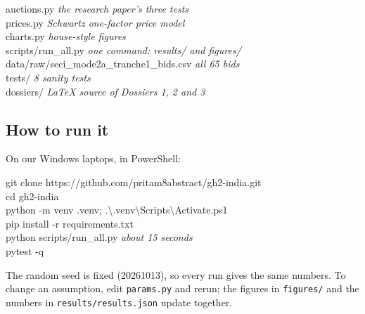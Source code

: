\begin{center}
\begin{minipage}{0.92\textwidth}
\hspace*{2em}auctions.py \hfill\textrm{\itshape\color{ink2} the research paper's three tests}\\
\hspace*{2em}prices.py \hfill\textrm{\itshape\color{ink2} Schwartz one-factor price model}\\
\hspace*{2em}charts.py \hfill\textrm{\itshape\color{ink2} house-style figures}\\
\hspace*{1em}scripts/run\_all.py \hfill\textrm{\itshape\color{ink2} one command: results/ and figures/}\\
\hspace*{1em}data/raw/seci\_mode2a\_tranche1\_bids.csv \hfill\textrm{\itshape\color{ink2} all 65 bids}\\
\hspace*{1em}tests/ \hfill\textrm{\itshape\color{ink2} 8 sanity tests}\\
\hspace*{1em}dossiers/ \hfill\textrm{\itshape\color{ink2} LaTeX source of Dossiers 1, 2 and 3}
\end{minipage}
\end{center}

\subsection{How to run it}
On our Windows laptops, in PowerShell:
\begin{center}
\begin{minipage}{0.9\textwidth}
\ttfamily\fontsize{8.4}{11}\selectfont\color{ink}
git clone https://github.com/pritam8abstract/gh2-india.git\\
cd gh2-india\\
python -m venv .venv; .\textbackslash .venv\textbackslash Scripts\textbackslash Activate.ps1\\
pip install -r requirements.txt\\
python scripts/run\_all.py \hfill\textrm{\itshape\color{ink2} about 15 seconds}\\
pytest -q
\end{minipage}
\end{center}
The random seed is fixed (20261013), so every run gives the same numbers. To change an assumption, edit \texttt{params.py} and rerun; the figures in \texttt{figures/} and the numbers in \texttt{results/results.json} update together.


